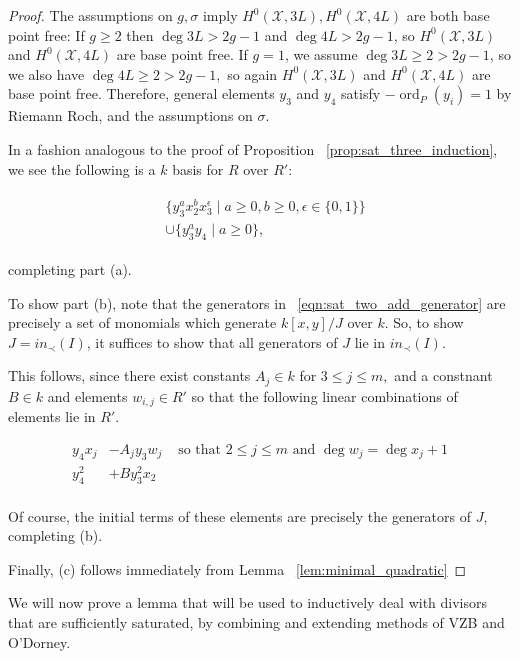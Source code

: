 \documentclass{amsart}
\theoremstyle{plain}
\theoremstyle{definition}
\theoremstyle{remark}
\numberwithin{equation}{section}
\newcommand \sx{\mathscr X}
\DeclareMathOperator{\ord}{ord}
\begin{document}
\begin{proof}
The assumptions on $g,\sigma$ imply $H^0(\sx, 3L), H^0(\sx, 4L)$ are both base point free: If $g \geq 2$ then $\deg 3L > 2g-1$ and $\deg 4L > 2g-1$, so $H^0(\sx, 3L)$ and $H^0(\sx, 4L)$ are base point free. If $g = 1$, we assume $\deg 3L \geq 2 > 2g-1$, so we also have $\deg 4L \geq 2 > 2g -1,$ so again $H^0(\sx, 3L)$ and $H^0(\sx, 4L)$ are base point free. Therefore, general elements $y_3$ and $y_4$ satisfy $-\ord
_P(y_i) = 1$ by Riemann Roch, and the assumptions on $\sigma$.  

In a fashion analogous to the proof of Proposition 
~\ref{prop:sat_three_induction}, we see 
the following is a $k$ basis for $R$ over $R'$:

\begin{align}
\label{eqn:sat_two_add_generator}
	\begin{split}
		&\{ y_3^ax_2^b x_3^\epsilon \mid a \geq 0, b 
		\geq 0, \epsilon \in \{0, 1\}\} \\
		&\cup \{ y_3^ay_4 \mid a \geq 0 \},
	\end{split}
\end{align}

\noindent completing part (a).

To show part (b), note that the generators in
~\ref{eqn:sat_two_add_generator} are precisely a set of monomials which
generate $k[x,y]/J$ over $k$. So, to show $J = in_\prec(I)$, it
suffices to show that all generators of $J$ lie in $in_\prec(I)$.

This follows, since there exist constants $A_j \in k$ for $3 \leq j \leq m,$ and a constnant $B \in k$ and
elements $w_{i,j} \in R'$ so that the following linear combinations
of elements lie in $R'$.

\begin{align*}
	y_4x_j &- A_j y_3 w_j & \text{ so that } 2 \leq j \leq m \text{ and } \deg w_j = \deg x_j + 1\\
	y_4^2 &+ B y_3^2 x_2 \\
\end{align*}

\noindent
Of course, the initial terms of these elements are precisely the
generators of $J$, completing (b).

Finally, (c) follows immediately from Lemma ~\ref{lem:minimal_quadratic}
\end{proof}


We will now prove a lemma that will be used to inductively deal with divisors that are sufficiently saturated, by combining and extending methods of VZB  and O'Dorney.
\end{document}

